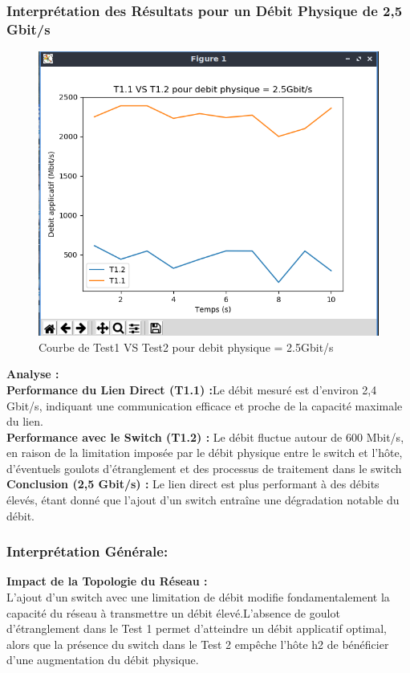 \subsubsection{Interprétation des Résultats pour un Débit Physique de 2,5 Gbit/s}
\begin{figure}[H]
    \centering
    \includegraphics[width=1\textwidth]{./images/T1vsT2pour2500.png}
    \caption{Courbe de Test1 VS Test2 pour debit physique = 2.5Gbit/s}
    \label{fig:exemple}
\end{figure}

\textbf{Analyse :}\\
\textbf{Performance du Lien Direct (T1.1) :}Le débit mesuré est d'environ 2,4 Gbit/s, indiquant une communication efficace et proche de la capacité maximale du lien.\\
\textbf{Performance avec le Switch (T1.2) :} Le débit fluctue autour de 600 Mbit/s, en raison de la limitation imposée par le débit physique entre le switch et l'hôte, d'éventuels goulots d'étranglement et des processus de traitement dans le switch\\
\textbf{Conclusion (2,5 Gbit/s) :} Le lien direct est plus performant à des débits élevés, étant donné que l'ajout d'un switch entraîne une dégradation notable du débit.
\newpage
\subsubsection{Interprétation Générale: }
\textbf{Impact de la Topologie du Réseau :}\\
L’ajout d’un switch avec une limitation de débit modifie fondamentalement la capacité du réseau à transmettre un débit élevé.L’absence de goulot d’étranglement dans le Test 1 permet d’atteindre un débit applicatif optimal, alors que la présence du switch dans le Test 2 empêche l’hôte h2 de bénéficier d’une augmentation du débit physique.

